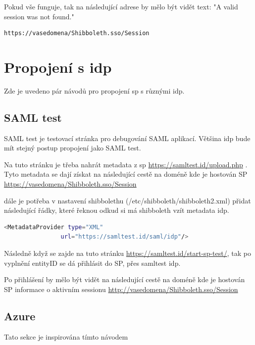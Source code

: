 Pokud vše funguje, tak na následující adrese by mělo být vidět text: "A valid session was not found."
\begin{lstlisting}[language=Bash]
https://vasedomena/Shibboleth.sso/Session
\end{lstlisting}

\section{Propojení s idp}

Zde je uvedeno pár návodů pro propojení sp s různými idp.

\subsection{SAML test}
SAML test je testovací stránka pro debugování SAML aplikací. Většina idp bude mít stejný postup propojení jako SAML test.



Na tuto stránku je třeba nahrát metadata z sp 
\url{https://samltest.id/upload.php}  . Tyto metadata se dají získat na následující cestě na doméně kde je hostován SP \url{https://vasedomena/Shibboleth.sso/Session }

dále je potřeba v nastavení shibbolethu (/etc/shibboleth/shibboleth2.xml) přidat následující řádky, které řeknou odkud si má shibboleth vzít metadata idp.
\begin{lstlisting}[language=Bash]
 <MetadataProvider type="XML"
                url="https://samltest.id/saml/idp"/>
\end{lstlisting}

Následně když se zajde na tuto stránku \url{https://samltest.id/start-sp-test/}, tak po vyplnění entityID se dá přihlásit do SP, přes samltest idp.

Po přihlášení by mělo být vidět na následující cestě na doméně kde je hostován SP informace o aktivním sessionu \url{http://vasedomena/Shibboleth.sso/Session} 



\subsection{Azure}

Tato sekce je inspirována tímto návodem\cite{AzureTutorial}


